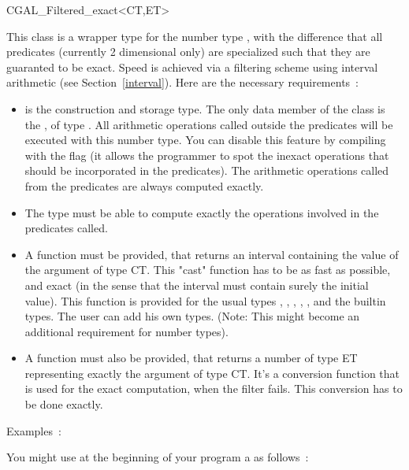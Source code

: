 \begin{ccClass} {CGAL_Filtered_exact<CT,ET>}
\label{filter}

This class is a wrapper type for the number type , with the difference
that all predicates (currently 2 dimensional only) are specialized
such that they are guaranted to be exact.  Speed is achieved via a filtering
scheme using interval arithmetic (see Section~\ref{interval}).  Here are the
necessary requirements~:

\begin{itemize}
\item {} is the construction and storage type.  The only data member of
      the class  is the , of type
      .
      All arithmetic operations called
      outside the predicates will be executed with this number type.  You can
      disable this feature by compiling with the flag
       (it allows the programmer
      to spot the inexact operations that should be incorporated in the
      predicates).
      The arithmetic operations called from the predicates are always computed
      exactly.
\item The  type must be able to compute exactly the operations involved
      in the predicates called.
\item A  function must
      be provided, that
      returns an interval containing the value of the argument of type CT.
      This "cast" function has to be as fast as possible, and exact (in the
      sense that the interval must contain surely the initial value).  This
      function is provided for the usual types , ,
      , , , and the
      builtin types.  The user can add his own types.  (Note: This might become
      an additional requirement for number types).
\item A  function must also be provided, that
      returns a number of type ET representing exactly the argument of type
      CT.  It's a conversion function that is used for the exact computation,
      when the filter fails.
      This conversion has to be done exactly.
\end{itemize}

Examples~:

You might use at the beginning of your program a  as follows~:


\end{ccClass}
